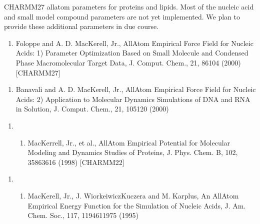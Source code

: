 \documentclass[letterpaper,11pt,english]{sphinxmanual}
\begin{document}
CHARMM27 all\sphinxhyphen{}atom parameters for proteins and lipids. Most of the nucleic acid and small model compound parameters are not yet implemented. We plan to provide these additional parameters in due course.
\begin{enumerate}
%
\setcounter{enumi}{13}
\item {} 
Foloppe and A. D. MacKerell, Jr., All\sphinxhyphen{}Atom Empirical Force Field for Nucleic Acids: 1) Parameter Optimization Based on Small Molecule and Condensed Phase Macromolecular Target Data, J. Comput. Chem., 21, 86\sphinxhyphen{}104 (2000)  {[}CHARMM27{]}

\end{enumerate}
\begin{enumerate}
%
\setcounter{enumi}{13}
\item {} 
Banavali and A. D. MacKerell, Jr., All\sphinxhyphen{}Atom Empirical Force Field for Nucleic Acids: 2) Application to Molecular Dynamics Simulations of DNA and RNA in Solution, J. Comput. Chem., 21, 105\sphinxhyphen{}120 (2000)

\end{enumerate}
\begin{enumerate}
%
\item {} \begin{enumerate}
%
\setcounter{enumii}{3}
\item {} 
MacKerrell, Jr., et al., All\sphinxhyphen{}Atom Empirical Potential for Molecular Modeling and Dynamics Studies of Proteins, J. Phys. Chem. B, 102, 3586\sphinxhyphen{}3616 (1998)  {[}CHARMM22{]}

\end{enumerate}

\end{enumerate}
\begin{enumerate}
%
\item {} \begin{enumerate}
%
\setcounter{enumii}{3}
\item {} 
MacKerell, Jr., J. Wiorkeiwicz\sphinxhyphen{}Kuczera and M. Karplus, An All\sphinxhyphen{}Atom Empirical Energy Function for the Simulation of Nucleic Acids, J. Am. Chem. Soc., 117, 11946\sphinxhyphen{}11975 (1995)

\end{enumerate}

\end{enumerate}
\end{document}
